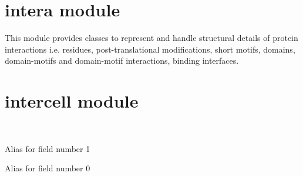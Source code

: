 \documentclass[letterpaper,10pt,english]{sphinxmanual}
\begin{document}
\section{intera module}
\label{\detokenize{reference:module-pypath.intera}}\label{\detokenize{reference:intera-module}}
This module provides classes to represent and handle
structural details of protein interactions
i.e. residues, post-translational modifications,
short motifs, domains, domain-motifs and
domain-motif interactions, binding interfaces.


\section{intercell module}
\label{\detokenize{reference:module-pypath.intercell}}\label{\detokenize{reference:intercell-module}}

\begin{fulllineitems}
\label{\detokenize{reference:pypath.intercell.IntercellRole}}~

\begin{fulllineitems}
\label{\detokenize{reference:pypath.intercell.IntercellRole.role}}
Alias for field number 1

\end{fulllineitems}


\begin{fulllineitems}
\label{\detokenize{reference:pypath.intercell.IntercellRole.source}}
Alias for field number 0

\end{fulllineitems}


\end{fulllineitems}
\end{document}
